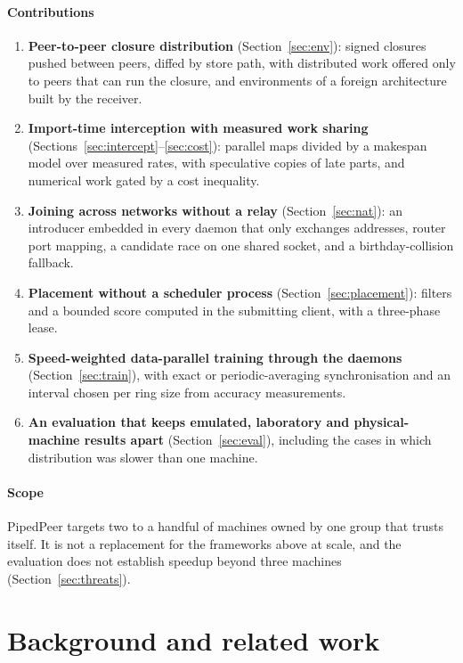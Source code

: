 \documentclass[5p,times,twocolumn]{elsarticle}
\begin{document}
\paragraph{Contributions}
\begin{enumerate}
\item \textbf{Peer-to-peer closure distribution} (Section~\ref{sec:env}):
signed closures pushed between peers, diffed by store path, with distributed
work offered only to peers that can run the closure, and environments of a
foreign architecture built by the receiver.
\item \textbf{Import-time interception with measured work sharing}
(Sections~\ref{sec:intercept}--\ref{sec:cost}): parallel maps divided by a
makespan model over measured rates, with speculative copies of late parts, and
numerical work gated by a cost inequality.
\item \textbf{Joining across networks without a relay} (Section~\ref{sec:nat}):
an introducer embedded in every daemon that only exchanges addresses, router
port mapping, a candidate race on one shared socket, and a birthday-collision
fallback.
\item \textbf{Placement without a scheduler process}
(Section~\ref{sec:placement}): filters and a bounded score computed in the
submitting client, with a three-phase lease.
\item \textbf{Speed-weighted data-parallel training through the daemons}
(Section~\ref{sec:train}), with exact or periodic-averaging synchronisation
and an interval chosen per ring size from accuracy measurements.
\item \textbf{An evaluation that keeps emulated, laboratory and physical-machine
results apart} (Section~\ref{sec:eval}), including the cases in which
distribution was slower than one machine.
\end{enumerate}

\paragraph{Scope} PipedPeer targets two to a handful of machines owned by one
group that trusts itself. It is not a replacement for the frameworks above at
scale, and the evaluation does not establish speedup beyond three machines
(Section~\ref{sec:threats}).

\section{Background and related work}
\label{sec:related}
\end{document}
